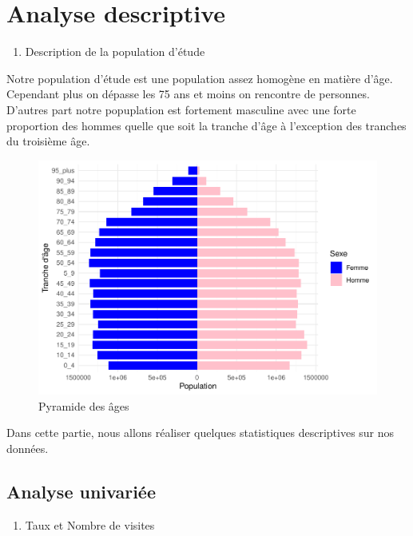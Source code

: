 \section{Analyse descriptive}\label{analyse-descriptive}

\begin{enumerate}
\def\labelenumi{\arabic{enumi}.}
\tightlist
\item
  Description de la population d'étude
\end{enumerate}

Notre population d'étude est une population assez homogène en matière
d'âge. Cependant plus on dépasse les 75 ans et moins on rencontre de
personnes. D'autres part notre popuplation est fortement masculine avec
une forte proportion des hommes quelle que soit la tranche d'âge à
l'exception des tranches du troisième âge.

\begin{figure}

{\centering \includegraphics{4_Analyse_Descriptive_files/figure-latex/unnamed-chunk-3-1} 

}

\caption{Pyramide des âges}\label{fig:unnamed-chunk-3}
\end{figure}

Dans cette partie, nous allons réaliser quelques statistiques
descriptives sur nos données.

\subsection{Analyse univariée}\label{analyse-univariuxe9e}

\begin{enumerate}
\def\labelenumi{\arabic{enumi}.}
\tightlist
\item
  Taux et Nombre de visites
\end{enumerate}

